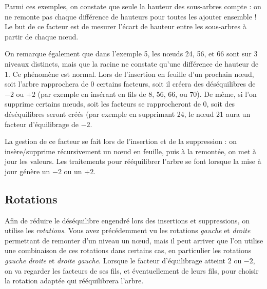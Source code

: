\documentclass[11pt,a4paper,twoside]{article}
\begin{document}
Parmi ces exemples, on constate que seule la hauteur des sous-arbres compte : on ne remonte pas chaque différence de hauteurs pour toutes les ajouter ensemble !
Le but de ce facteur est de mesurer l'écart de hauteur entre les sous-arbres à partir de chaque nœud.

\medskip

On remarque également que dans l'exemple 5, les nœuds 24, 56, et 66 sont sur 3 niveaux distincts, mais que la racine ne constate qu'une différence de hauteur de $ 1 $.
Ce phénomène est normal.
Lors de l'insertion en feuille d'un prochain nœud, soit l'arbre rapprochera de $ 0 $ certains facteurs, soit il créera des déséquilibres de $ -2 $ ou $ +2 $ (par exemple en insérant en fils de 8, 56, 66, ou 70).
De même, si l'on supprime certains nœuds, soit les facteurs se rapprocheront de $ 0 $, soit des déséquilibres seront créés (par exemple en supprimant 24, le nœud 21 aura un facteur d'équilibrage de $ -2 $.

\medskip

La gestion de ce facteur se fait lors de l'insertion et de la suppression : on insère/supprime récursivement un nœud en feuille, puis à la remontée, on met à jour les valeurs.
Les traitements pour rééquilibrer l'arbre se font lorsque la mise à jour génère un $ -2 $ ou un $ +2 $.




\subsection{Rotations}

Afin de réduire le déséquilibre engendré lors des insertions et suppressions, on utilise les \textit{rotations}.
Vous avez précédemment vu les rotations \textit{gauche} et \textit{droite} permettant de remonter d'un niveau un nœud, mais il peut arriver que l'on utilise une combinaison de ces rotations dans certains cas, en particulier les rotations \textit{gauche droite} et \textit{droite gauche}.
Lorsque le facteur d'équilibrage atteint $ 2 $ ou $ -2 $, on va regarder les facteurs de ses fils, et éventuellement de leurs fils, pour choisir la rotation adaptée qui rééquilibrera l'arbre.

\end{document}
